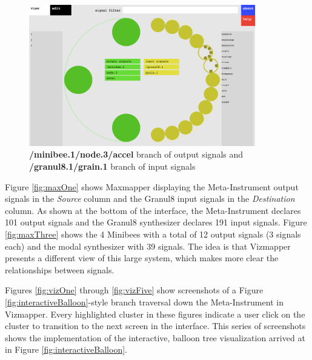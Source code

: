 \begin{figure}[p]
\centering
\includegraphics[width=0.88\textwidth]{vizmapperSix.png}
\caption{\textbf{/minibee.1/node.3/accel} branch of output signals and \textbf{/granul8.1/grain.1} branch of input signals}
\label{fig:vizSix}
\end{figure}

Figure \ref{fig:maxOne} shows Maxmapper displaying the Meta-Instrument output signals in the \emph{Source} column and the Granul8 input signals in the \emph{Destination} column. As shown at the bottom of the interface, the Meta-Instrument declares 101 output signals and the Granul8 synthesizer declares 191 input signals. Figure \ref{fig:maxThree} shows the 4 Minibees with a total of 12 output signals (3 signals each) and the modal synthesizer with 39 signals. The idea is that Vizmapper presents a different view of this large system, which makes more clear the relationships between signals.

Figures \ref{fig:vizOne} through \ref{fig:vizFive} show screenshots of a Figure \ref{fig:interactiveBalloon}-style branch traversal down the Meta-Instrument in Vizmapper. Every highlighted cluster in these figures indicate a user click on the cluster to transition to the next screen in the interface. This series of screenshots shows the implementation of the interactive, balloon tree visualization arrived at in Figure \ref{fig:interactiveBalloon}. 

